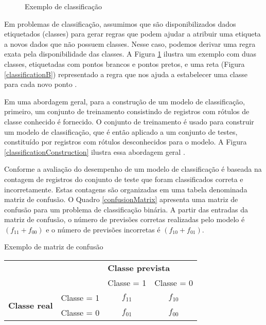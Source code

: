 \begin{figure}[!htb]
  \centering
  \caption{\label{classification} Exemplo de classificação}
  \qquad
  \vspace{1.5em}
\end{figure}

Em problemas de classificação, assumimos que são disponibilizados dados
etiquetados (classes) para gerar regras que podem ajudar a atribuir uma etiqueta
a novos dados que não possuem classes. Nesse caso, podemos derivar uma regra
exata pela disponibilidade das classes. A Figura \ref{classification} ilustra um
exemplo com duas classes, etiquetadas com pontos brancos e pontos pretos, e uma
reta (Figura \ref{classificationB}) representado a regra que nos ajuda a
estabelecer uma classe para cada novo ponto \cite{suthaharan2016machine}.

{}

Em uma abordagem geral, para a construção de um modelo de classificação,
primeiro, um conjunto de treinamento consistindo de registros com rótulos de
classe conhecido é fornecido. O conjunto de treinamento é usado para construir
um modelo de classificação, que é então aplicado a um conjunto de testes,
constituído por registros com rótulos desconhecidos para o modelo. A Figura
\ref{classificationConstruction} ilustra essa abordagem geral
\cite{tan2009introduccao}.

Conforme  a avaliação do desempenho de um modelo
de classificação é baseada na contagem de registros do conjunto de teste que
foram classificados correta e incorretamente. Estas contagens são organizadas em
uma tabela denominada matriz de confusão. O Quadro \ref{confusionMatrix}
apresenta uma matriz de confusão para um problema de classificação binária. A
partir das entradas da matriz de confusão, o número de previsões corretas
realizadas pelo modelo é \((f_{11} + f_{00})\) e o número de previsões
incorretas é \((f_{10} + f_{01})\).

\begin{quadro}[]
  \centering
  \caption{Exemplo de matriz de confusão}
  \label{confusionMatrix}
  \begin{tabular}{ll|c|c|}
    \cline{3-4}
    \multicolumn{1}{c}{\textbf{}} & \multicolumn{1}{c|}{\textbf{}} & \multicolumn{2}{l|}{\textbf{Classe prevista}} \\ \cline{3-4}
    & \multicolumn{1}{c|}{\textbf{}} & Classe = 1 & Classe = 0 \\ \hline
    \multicolumn{1}{|l|}{\multirow{2}{*}{\textbf{Classe real}}} & Classe = 1 & $f_{11}$ & $f_{10}$ \\ \cline{2-4}
    \multicolumn{1}{|l|}{} & Classe = 0 & $f_{01}$ & $f_{00}$ \\ \hline
  \end{tabular}
  \Ididthis
\end{quadro}

